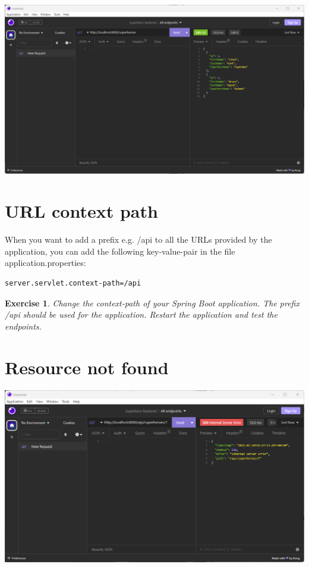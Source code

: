 \documentclass[a4paper, 12pt]{report}
\newenvironment{boxexercise}
{\begin{tcolorbox}
[enhanced jigsaw,breakable,pad at break*=1mm,
 colback=tsyellow!20,boxrule=0pt,frame hidden]}
{\end{tcolorbox}}
\newtheorem{envoefening}{\textbf{Exercise}}[chapter]
\newenvironment{oefening}
               {\begin{boxexercise}\begin{envoefening}}
               {\end{envoefening}\end{boxexercise}}
\begin{document}
\includegraphics[width=\textwidth]{./images/chapter2/get-request-insomnia.png}

\section{URL context path}

When you want to add a prefix e.g. /api to all the URLs provided by the application, you can add the following key-value-pair in the file application.properties:

\begin{lstlisting}[frame=single]
server.servlet.context-path=/api
\end{lstlisting}


\begin{oefening}
Change the context-path of your Spring Boot application. The prefix /api should be used for the application.  Restart the application and test the endpoints.
\end{oefening}

\section{Resource not found}

\includegraphics[width=\textwidth]{./images/chapter2/not_found_1.png}
\end{document}
